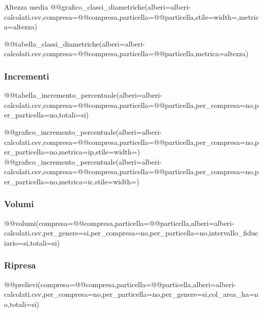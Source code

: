 {\begin{minipage}[t][][c]{0.5\textwidth}
\begin{flushright}
        \end{flushright}
    \endgroup
\end{minipage}
\hfill
\begin{minipage}[t][][c]{0.5\textwidth}
    \noindent \textsf{Altezza media}
    @@grafico_classi_diametriche(alberi=alberi-calcolati.csv,compresa=@@compresa,particella=@@particella,stile=width=\textwidth,metrica=altezza)
    \begingroup
        \setlength{\LTleft}{0pt}
        \begin{flushright}
            @@tabella_classi_diametriche(alberi=alberi-calcolati.csv,compresa=@@compresa,particella=@@particella,metrica=altezza)
        \end{flushright}
    \endgroup
\end{minipage}

\subsubsection*{Incrementi}
\begin{minipage}[t][][t]{0.5\textwidth}
    \begingroup
        \setlength{\LTleft}{0pt}
        \vspace{-\baselineskip}
        \begin{flushleft}
            @@tabella_incremento_percentuale(alberi=alberi-calcolati.csv,compresa=@@compresa,particella=@@particella,per_compresa=no,per_particella=no,totali=si)
        \end{flushleft}
    \endgroup
\end{minipage}%
\hfill
\begin{minipage}[t][][c]{0.5\textwidth}
    \begin{flushright}
        @@grafico_incremento_percentuale(alberi=alberi-calcolati.csv,compresa=@@compresa,particella=@@particella,per_compresa=no,per_particella=no,metrica=ip,stile=width=\textwidth)
        \vspace*{1em}
        @@grafico_incremento_percentuale(alberi=alberi-calcolati.csv,compresa=@@compresa,particella=@@particella,per_compresa=no,per_particella=no,metrica=ic,stile=width=\textwidth)
    \end{flushright}
\end{minipage}

\subsubsection*{Volumi}
@@volumi(compresa=@@compresa,particella=@@particella,alberi=alberi-calcolati.csv,per_genere=si,per_compresa=no,per_particella=no,intervallo_fiduciario=si,totali=si)

\subsubsection*{Ripresa}
@@prelievi(compresa=@@compresa,particella=@@particella,alberi=alberi-calcolati.csv,per_compresa=no,per_particella=no,per_genere=si,col_area_ha=no,totali=si)

}
\clearpage
